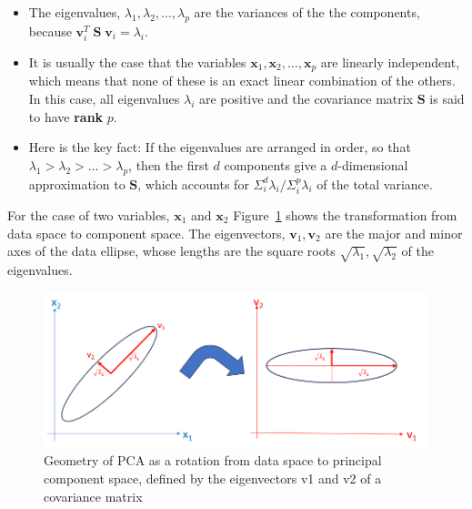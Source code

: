 \documentclass[
  letterpaper,
  10pt,
  krantz2]{krantz}
\begin{document}
\begin{itemize}
\item
  The eigenvalues, \(\lambda_1, \lambda_2, \dots, \lambda_p\) are the
  variances of the the components, because
  \(\mathbf{v}_i^T \;\mathbf{S} \; \mathbf{v}_i = \lambda_i\).
\item
  It is usually the case that the variables
  \(\mathbf{x}_1, \mathbf{x}_2, \dots, \mathbf{x}_p\) are linearly
  independent, which means that none of these is an exact linear
  combination of the others. In this case, all eigenvalues \(\lambda_i\)
  are positive and the covariance matrix \(\mathbf{S}\) is said to have
  \textbf{rank} \(p\).
\item
  Here is the key fact: If the eigenvalues are arranged in order, so
  that \(\lambda_1 > \lambda_2 > \dots > \lambda_p\), then the first
  \(d\) components give a \(d\)-dimensional approximation to
  \(\mathbf{S}\), which accounts for
  \(\Sigma_i^d \lambda_i / \Sigma_i^p \lambda_i\) of the total variance.
\end{itemize}

For the case of two variables, \(\mathbf{x}_1\) and \(\mathbf{x}_2\)
Figure~\ref{fig-pca-rotation} shows the transformation from data space
to component space. The eigenvectors, \(\mathbf{v}_1, \mathbf{v}_2\) are
the major and minor axes of the data ellipse, whose lengths are the
square roots \(\sqrt{\lambda_1}, \sqrt{\lambda_2}\) of the eigenvalues.

\begin{figure}

{\centering \includegraphics[width=1\textwidth,height=\textheight]{images/pca-rotation.png}

}

\caption{\label{fig-pca-rotation}Geometry of PCA as a rotation from data
space to principal component space, defined by the eigenvectors v1 and
v2 of a covariance matrix}

\end{figure}
\end{document}
